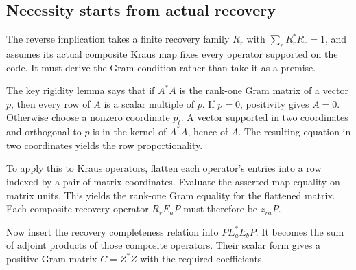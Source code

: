 

\subsection{Necessity starts from actual recovery}
The reverse implication takes a finite recovery family $R_r$ with $\sum_rR_r^*R_r=1$, and assumes its actual composite Kraus map fixes every operator supported on the code. It must derive the Gram condition rather than take it as a premise.

The key rigidity lemma says that if $A^*A$ is the rank-one Gram matrix of a vector $p$, then every row of $A$ is a scalar multiple of $p$. If $p=0$, positivity gives $A=0$. Otherwise choose a nonzero coordinate $p_t$. A vector supported in two coordinates and orthogonal to $p$ is in the kernel of $A^*A$, hence of $A$. The resulting equation in two coordinates yields the row proportionality.


To apply this to Kraus operators, flatten each operator's entries into a row indexed by a pair of matrix coordinates. Evaluate the asserted map equality on matrix units. This yields the rank-one Gram equality for the flattened matrix. Each composite recovery operator $R_rE_aP$ must therefore be $z_{ra}P$.

Now insert the recovery completeness relation into $PE_a^*E_bP$. It becomes the sum of adjoint products of those composite operators. Their scalar form gives a positive Gram matrix $C=Z^*Z$ with the required coefficients.



